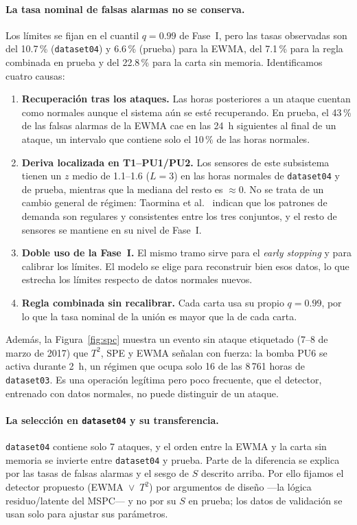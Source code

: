 \documentclass[11pt,a4paper]{article}
\begin{document}
\paragraph{La tasa nominal de falsas alarmas no se conserva.} Los límites se fijan en
el cuantil $q=0.99$ de Fase~I, pero las tasas observadas son del 10.7\,\%
(\texttt{dataset04}) y 6.6\,\% (prueba) para la EWMA, del 7.1\,\% para la regla
combinada en prueba y del 22.8\,\% para la carta sin memoria. Identificamos cuatro
causas:
\begin{enumerate}[leftmargin=*]
\item \textbf{Recuperación tras los ataques.} Las horas posteriores a un ataque
  cuentan como normales aunque el sistema aún se esté recuperando. En prueba, el
  43\,\% de las falsas alarmas de la EWMA cae en las 24~h siguientes al final de un
  ataque, un intervalo que contiene solo el 10\,\% de las horas normales.
\item \textbf{Deriva localizada en T1--PU1/PU2.} Los sensores de este subsistema
  tienen un $z$ medio de 1.1--1.6 ($L=3$) en las horas normales de \texttt{dataset04}
  y de prueba, mientras que la mediana del resto es $\approx0$. No se trata de un
  cambio general de régimen: Taormina et al.~\cite{taormina2018} indican que los
  patrones de demanda son regulares y consistentes entre los tres conjuntos, y el
  resto de sensores se mantiene en su nivel de Fase~I.
\item \textbf{Doble uso de la Fase~I.} El mismo tramo sirve para el \emph{early
  stopping} y para calibrar los límites. El modelo se elige para reconstruir bien esos
  datos, lo que estrecha los límites respecto de datos normales nuevos.
\item \textbf{Regla combinada sin recalibrar.} Cada carta usa su propio $q=0.99$, por
  lo que la tasa nominal de la unión es mayor que la de cada carta.
\end{enumerate}
Además, la Figura~\ref{fig:spc} muestra un evento sin ataque etiquetado (7--8 de marzo
de 2017) que $T^2$, SPE y EWMA señalan con fuerza: la bomba PU6 se activa durante 2~h,
un régimen que ocupa solo 16 de las 8\,761 horas de \texttt{dataset03}. Es una
operación legítima pero poco frecuente, que el detector, entrenado con datos normales,
no puede distinguir de un ataque.

\paragraph{La selección en \texttt{dataset04} y su transferencia.} \texttt{dataset04}
contiene solo 7 ataques, y el orden entre la EWMA y la carta sin memoria se invierte
entre \texttt{dataset04} y prueba. Parte de la diferencia se explica por las tasas de
falsas alarmas y el sesgo de $S$ descrito arriba. Por ello fijamos el detector
propuesto (EWMA~$\vee$~$T^2$) por argumentos de diseño ---la lógica residuo/latente del
MSPC--- y no por su $S$ en prueba; los datos de validación se usan solo para ajustar
sus parámetros.
\end{document}
